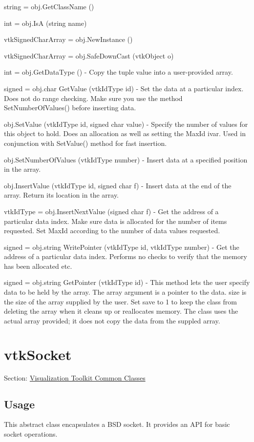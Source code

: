 \begin{DoxyItemize}
\item {\ttfamily string = obj.\-Get\-Class\-Name ()}  
\item {\ttfamily int = obj.\-Is\-A (string name)}  
\item {\ttfamily vtk\-Signed\-Char\-Array = obj.\-New\-Instance ()}  
\item {\ttfamily vtk\-Signed\-Char\-Array = obj.\-Safe\-Down\-Cast (vtk\-Object o)}  
\item {\ttfamily int = obj.\-Get\-Data\-Type ()} -\/ Copy the tuple value into a user-\/provided array.  
\item {\ttfamily signed = obj.\-char Get\-Value (vtk\-Id\-Type id)} -\/ Set the data at a particular index. Does not do range checking. Make sure you use the method Set\-Number\-Of\-Values() before inserting data.  
\item {\ttfamily obj.\-Set\-Value (vtk\-Id\-Type id, signed char value)} -\/ Specify the number of values for this object to hold. Does an allocation as well as setting the Max\-Id ivar. Used in conjunction with Set\-Value() method for fast insertion.  
\item {\ttfamily obj.\-Set\-Number\-Of\-Values (vtk\-Id\-Type number)} -\/ Insert data at a specified position in the array.  
\item {\ttfamily obj.\-Insert\-Value (vtk\-Id\-Type id, signed char f)} -\/ Insert data at the end of the array. Return its location in the array.  
\item {\ttfamily vtk\-Id\-Type = obj.\-Insert\-Next\-Value (signed char f)} -\/ Get the address of a particular data index. Make sure data is allocated for the number of items requested. Set Max\-Id according to the number of data values requested.  
\item {\ttfamily signed = obj.\-string Write\-Pointer (vtk\-Id\-Type id, vtk\-Id\-Type number)} -\/ Get the address of a particular data index. Performs no checks to verify that the memory has been allocated etc.  
\item {\ttfamily signed = obj.\-string Get\-Pointer (vtk\-Id\-Type id)} -\/ This method lets the user specify data to be held by the array. The array argument is a pointer to the data. size is the size of the array supplied by the user. Set save to 1 to keep the class from deleting the array when it cleans up or reallocates memory. The class uses the actual array provided; it does not copy the data from the suppled array.  
\end{DoxyItemize}\hypertarget{vtkcommon_vtksocket}{}\section{vtk\-Socket}\label{vtkcommon_vtksocket}
Section\-: \hyperlink{sec_vtkcommon}{Visualization Toolkit Common Classes} \hypertarget{vtkwidgets_vtkxyplotwidget_Usage}{}\subsection{Usage}\label{vtkwidgets_vtkxyplotwidget_Usage}
This abstract class encapsulates a B\-S\-D socket. It provides an A\-P\-I for basic socket operations.

